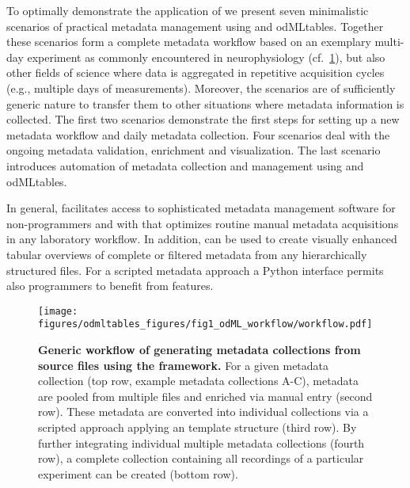 To optimally demonstrate the application of  we present seven minimalistic scenarios of practical metadata management using  and odMLtables. Together these scenarios form a complete metadata workflow based on an exemplary multi-day experiment as commonly encountered in neurophysiology (cf.~\cref{fig:odMLgeneration}), but also other fields of science where data is aggregated in repetitive acquisition cycles (e.g., multiple days of measurements). Moreover, the scenarios are of sufficiently generic nature to transfer them to other situations where metadata information is collected. The first two scenarios demonstrate the first steps for setting up a new metadata workflow and daily metadata collection. Four scenarios deal with the ongoing metadata validation, enrichment and visualization. The last scenario introduces automation of metadata collection and management using  and odMLtables.

In general,  facilitates access to sophisticated metadata management software  for non-programmers and with that optimizes routine manual metadata acquisitions in any laboratory workflow. In addition,  can be used to create visually enhanced tabular overviews of complete or filtered metadata from any hierarchically structured  files. For a scripted metadata approach a Python interface permits also programmers to benefit from  features.

\begin{figure}[!ht]
\begin{center}
\texttt{[image: figures/odmltables\_figures/fig1\_odML\_workflow/workflow.pdf]}
\caption[Generic workflow of generating metadata collections from source files using the  framework]{{\label{fig:odMLgeneration}
\textbf{Generic workflow of generating metadata collections from source files using the  framework.} For a given metadata collection (top row, example metadata collections A-C), metadata are pooled from multiple files and enriched via manual entry (second row). These metadata are converted into individual collections via a scripted approach applying an  template structure (third row). By further integrating individual multiple metadata collections (fourth row), a complete  collection containing all recordings of a particular experiment can be created (bottom row).
}}
\end{center}
\end{figure}


